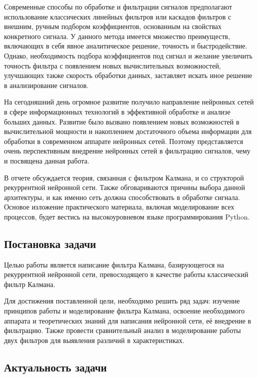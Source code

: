 \documentclass[a4paper,11pt]{article} %
\begin{document}
Современные способы по обработке и фильтрации сигналов предполагают использование  классических линейных фильтров или каскадов фильтров с внешним,  ручным подбором коэффициентов, основанным на свойствах конкретного сигнала. У данного метода имеется множество преимуществ, включающих в себя явное аналитическое решение, точность и быстродействие. Однако, необходимость подбора коэффициентов под сигнал и желание увеличить точность фильтра с появлением новых вычислительных возможностей, улучшающих также скорость обработки данных, заставляет искать иное решение в анализирование сигналов. 

На сегодняшний день огромное развитие получило направление нейронных сетей в сфере информационных технологий в эффективной обработке и анализе больших данных. Развитие было вызвано появлением новых возможностей в вычислительной мощности и накоплением достаточного объема информации для обработки в современном аппарате нейронных сетей. Поэтому представляется очень перспективным внедрение нейронных сетей в фильтрацию сигналов, чему и посвящена данная работа. 

В отчете обсуждается теория, связанная с фильтром Калмана, и со структорой рекуррентной нейронной сети. Также обговариваются причины выбора данной архитектуры, и как именно сеть должна способствовать в обработке сигнала. Основое изложение практического материала, включая моделирование всех процессов, будет вестись на высокоуровневом языке программирования Python.

\pagebreak
\subsection{Постановка задачи}

Целью работы является написание фильтра Калмана,  базирующегося на рекуррентной нейронной сети,  превосходящего в качестве работы классический фильтр Калмана.

Для достижения поставленной цели,  необходимо решить ряд задач: изучение принципов работы и моделирование фильтра Калмана,  освоение необходимого аппарата и теоретических знаний для написания нейронной сети,  её внедрение в фильтрацию.  Также провести  сравнительный анализ в моделирование работы двух фильтров для выявления различий в характеристиках.

\subsection{Актуальность задачи}
\end{document}
